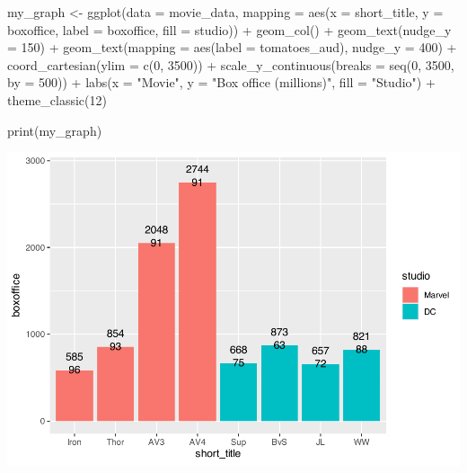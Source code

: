 \documentclass[
]{krantz}
\makeatletter
\newenvironment{Shaded}{\begin{snugshade}}{\end{snugshade}}
\newcommand{\AttributeTok}[1]{\textcolor[rgb]{0.61,0.61,0.61}{#1}}
\newcommand{\DecValTok}[1]{\textcolor[rgb]{0.06,0.06,0.06}{#1}}
\newcommand{\FunctionTok}[1]{\textcolor[rgb]{0,0,0}{#1}}
\newcommand{\NormalTok}[1]{#1}
\newcommand{\OtherTok}[1]{\textcolor[rgb]{0.37,0.37,0.37}{#1}}
\newcommand{\SpecialCharTok}[1]{\textcolor[rgb]{0,0,0}{#1}}
\newcommand{\StringTok}[1]{\textcolor[rgb]{0.5,0.5,0.5}{#1}}
\newenvironment{kframe}{%
\medskip{}
\setlength{\fboxsep}{.8em}
 \def\at@end@of@kframe{}%
 \ifinner\ifhmode%
  \def\at@end@of@kframe{\end{minipage}}%
  \begin{minipage}{\columnwidth}%
 \fi\fi%
 \def\FrameCommand##1{\hskip\@totalleftmargin \hskip-\fboxsep
 \colorbox{shadecolor}{##1}\hskip-\fboxsep
     \hskip-\linewidth \hskip-\@totalleftmargin \hskip\columnwidth}%
 \MakeFramed {\advance\hsize-\width
   \@totalleftmargin\z@ \linewidth\hsize
   \@setminipage}}%
 {\par\unskip\endMakeFramed%
 \at@end@of@kframe}
\renewenvironment{Shaded}{\begin{kframe}}{\end{kframe}}
\makeatother
\begin{document}
\begin{Shaded}
\begin{Highlighting}[]
\NormalTok{my\_graph }\OtherTok{\textless{}{-}} \FunctionTok{ggplot}\NormalTok{(}\AttributeTok{data =}\NormalTok{ movie\_data,}
           \AttributeTok{mapping =} \FunctionTok{aes}\NormalTok{(}\AttributeTok{x =}\NormalTok{ short\_title,}
                         \AttributeTok{y =}\NormalTok{ boxoffice,}
                         \AttributeTok{label =}\NormalTok{ boxoffice, }
                         \AttributeTok{fill =}\NormalTok{ studio)) }\SpecialCharTok{+}
  \FunctionTok{geom\_col}\NormalTok{() }\SpecialCharTok{+}
  \FunctionTok{geom\_text}\NormalTok{(}\AttributeTok{nudge\_y =} \DecValTok{150}\NormalTok{)  }\SpecialCharTok{+}
  \FunctionTok{geom\_text}\NormalTok{(}\AttributeTok{mapping =} \FunctionTok{aes}\NormalTok{(}\AttributeTok{label =}\NormalTok{ tomatoes\_aud), }
            \AttributeTok{nudge\_y =} \DecValTok{400}\NormalTok{) }\SpecialCharTok{+}
  \FunctionTok{coord\_cartesian}\NormalTok{(}\AttributeTok{ylim =} \FunctionTok{c}\NormalTok{(}\DecValTok{0}\NormalTok{, }\DecValTok{3500}\NormalTok{)) }\SpecialCharTok{+}
  \FunctionTok{scale\_y\_continuous}\NormalTok{(}\AttributeTok{breaks =} \FunctionTok{seq}\NormalTok{(}\DecValTok{0}\NormalTok{, }\DecValTok{3500}\NormalTok{, }\AttributeTok{by =} \DecValTok{500}\NormalTok{)) }\SpecialCharTok{+}
  \FunctionTok{labs}\NormalTok{(}\AttributeTok{x =} \StringTok{"Movie"}\NormalTok{,}
       \AttributeTok{y =} \StringTok{"Box office (millions)"}\NormalTok{,}
       \AttributeTok{fill =} \StringTok{"Studio"}\NormalTok{) }\SpecialCharTok{+}
  \FunctionTok{theme\_classic}\NormalTok{(}\DecValTok{12}\NormalTok{)}

\FunctionTok{print}\NormalTok{(my\_graph)}
\end{Highlighting}
\end{Shaded}

\includegraphics[width=0.65\linewidth]{bookdown_files/figure-latex/unnamed-chunk-119-1}
\end{document}
